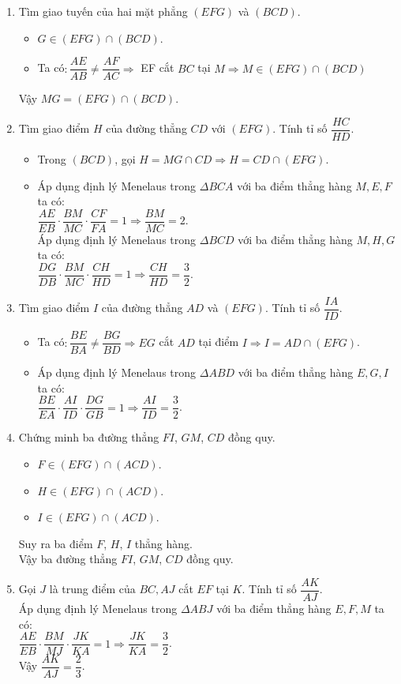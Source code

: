 \begin{bt}
{		\begin{enumerate}
			\item Tìm giao tuyến của hai mặt phẳng $(EFG)$ và $(BCD)$.
			\begin{itemize}
				\item $G \in (EFG) \cap (BCD)$.
				\item Ta có$\colon \dfrac{AE}{AB} \neq \dfrac{AF}{AC} \Rightarrow $ EF cắt $BC$ tại $M \Rightarrow M \in (EFG)\cap (BCD)$
			\end{itemize}
			Vậy $MG =(EFG)\cap (BCD)$.
			\item Tìm giao điểm $H$ của đường thẳng $CD$ với $(EFG)$. Tính tỉ số $\dfrac{HC}{HD}$.
			\begin{itemize}
				\item Trong $(BCD)$, gọi $H =MG \cap CD \Rightarrow H =CD \cap (EFG)$.
				\item Áp dụng định lý Menelaus trong $\Delta BCA$ với ba điểm thẳng hàng $M, E, F$ ta có$\colon$\\$\dfrac{AE}{EB}\cdot \dfrac{BM}{MC}\cdot \dfrac{CF}{FA}=1 \Rightarrow \dfrac{BM}{MC}=2$.
				\\Áp dụng định lý Menelaus trong $\Delta BCD$ với ba điểm thẳng hàng $M, H, G$ ta có$\colon$\\$\dfrac{DG}{DB}\cdot \dfrac{BM}{MC}\cdot \dfrac{CH}{HD}=1 \Rightarrow \dfrac{CH}{HD}=\dfrac{3}{2}$.
			\end{itemize}
			\item Tìm giao điểm $I$ của đường thẳng $AD$ và $(EFG)$. Tính tỉ số $\dfrac{IA}{ID}$.
			\begin{itemize}
				\item Ta có$\colon \dfrac{BE}{BA}\neq \dfrac{BG}{BD} \Rightarrow EG$ cắt $AD$ tại điểm $I \Rightarrow I = AD \cap (EFG)$.
				\item Áp dụng định lý Menelaus trong $\Delta ABD$ với ba điểm thẳng hàng $E, G, I$ ta có$\colon$\\$\dfrac{BE}{EA}\cdot \dfrac{AI}{ID}\cdot \dfrac{DG}{GB}=1 \Rightarrow \dfrac{AI}{ID}=\dfrac{3}{2}$.
			\end{itemize}
			\item Chứng minh ba đường thẳng $FI$, $GM$, $CD$ đồng quy.
			\begin{itemize}
				\item $F\in (EFG)\cap (ACD)$.
				\item $H \in (EFG)\cap (ACD)$.
				\item $I \in (EFG)\cap (ACD)$.
			\end{itemize}
			Suy ra ba điểm $F$, $H$, $I$ thẳng hàng.\\
			Vậy ba đường thẳng $FI$, $GM$, $CD$ đồng quy.
			\item Gọi $J$ là trung điểm của $BC, AJ$ cắt $EF$ tại $K$. Tính tỉ số $\dfrac{AK}{AJ}$.\\
			Áp dụng định lý Menelaus trong $\Delta ABJ$ với ba điểm thẳng hàng $E, F, M$ ta có$\colon$\\$\dfrac{AE}{EB}\cdot \dfrac{BM}{MJ}\cdot \dfrac{JK}{KA}=1 \Rightarrow \dfrac{JK}{KA}=\dfrac{3}{2}$.\\
			Vậy $\dfrac{AK}{AJ}=\dfrac{2}{3}$.
		\end{enumerate}
	}
	
\end{bt}